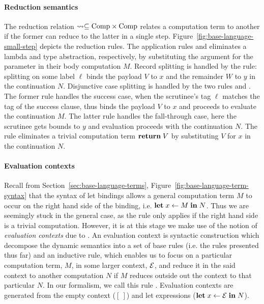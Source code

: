 \documentclass[12pt,phd,lfcs,twoside,openright,logo,leftchapter,normalheadings]{infthesis}
\theoremstyle{plain}
\theoremstyle{definition}
\begin{document}
\paragraph{Reduction semantics}
The reduction relation $\leadsto \subseteq \textrm{Comp} \times \textrm{Comp}$
relates a computation term to another if the former can reduce to the
latter in a single step. Figure~\ref{fig:base-language-small-step}
depicts the reduction rules. The application rules  and
 eliminates a lambda and type abstraction, respectively,
by substituting the argument for the parameter in their body
computation $M$.
%
Record splitting is handled by the  rule: splitting on
some label $\ell$ binds the payload $V$ to $x$ and the remainder $W$
to $y$ in the continuation $N$.
%
Disjunctive case splitting is handled by the two rules
 and . The former rule handles the
success case, when the scrutinee's tag $\ell$ matches the tag of the
success clause, thus binds the payload $V$ to $x$ and proceeds to
evaluate the continuation $M$. The latter rule handles the
fall-through case, here the scrutinee gets bounds to $y$ and
evaluation proceeds with the continuation $N$.
%
The  rule eliminates a trivial computation term
$\mathbf{return}\;V$ by substituting $V$ for $x$ in the continuation $N$.
%


\paragraph{Evaluation contexts}
Recall from Section~\ref{sec:base-language-terms},
Figure~\ref{fig:base-language-term-syntax} that the syntax of let
bindings allows a general computation term $M$ to occur on the right
hand side of the binding, i.e. $\mathbf{let}\;x \leftarrow M \;\mathbf{in}\;N$. Thus we
are seemingly stuck in the general case, as the  rule only
applies if the right hand side is a trivial computation.
%
However, it is at this stage we make use of the notion of
\emph{evaluation contexts} due to \citet{Felleisen87}. An evaluation
context is syntactic construction which decompose the dynamic
semantics into a set of base rules (i.e. the rules presented thus far)
and an inductive rule, which enables us to focus on a particular
computation term, $M$, in some larger context, $\mathcal{E}$, and reduce it in
the said context to another computation $N$ if $M$ reduces outside out
the context to that particular $N$. In our formalism, we call this
rule . Evaluation contexts are generated from the empty
context ($[~]$) and let expressions ($\mathbf{let}\;x \leftarrow \mathcal{E} \;\mathbf{in}\;N$).
\end{document}
